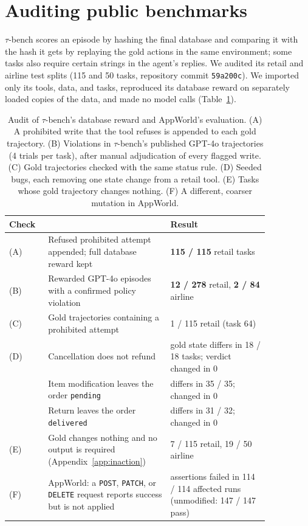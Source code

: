 \documentclass[11pt,a4paper]{article}
\begin{document}
\section{Auditing public benchmarks}
\label{sec:taubench}

$\tau$-bench scores an episode by hashing the final database and comparing it with the hash it gets by replaying the gold actions in the same environment; some tasks also require certain strings in the agent's replies. We audited its retail and airline test splits (115 and 50 tasks, repository commit \texttt{59a200c}). We imported only its tools, data, and tasks, reproduced its database reward on separately loaded copies of the data, and made no model calls (Table~\ref{tab:taubench}).

\begin{table}[t]
\centering
\small
\caption{Audit of $\tau$-bench's database reward and AppWorld's evaluation. (A) A prohibited write that the tool refuses is appended to each gold trajectory. (B) Violations in $\tau$-bench's published GPT-4o trajectories (4 trials per task), after manual adjudication of every flagged write. (C) Gold trajectories checked with the same status rule. (D) Seeded bugs, each removing one state change from a retail tool. (E) Tasks whose gold trajectory changes nothing. (F) A different, coarser mutation in AppWorld.}
\label{tab:taubench}
\begin{tabular}{l p{0.47\linewidth} p{0.38\linewidth}}
\toprule
\multicolumn{2}{l}{Check} & Result \\
\midrule
(A) & Refused prohibited attempt appended; full database reward kept & \textbf{115 / 115} retail tasks \\
(B) & Rewarded GPT-4o episodes with a confirmed policy violation & \textbf{12 / 278} retail, \textbf{2 / 84} airline \\
(C) & Gold trajectories containing a prohibited attempt & 1 / 115 retail (task 64) \\
\midrule
(D) & Cancellation does not refund & gold state differs in 18 / 18 tasks; verdict changed in 0 \\
    & Item modification leaves the order \texttt{pending} & differs in 35 / 35; changed in 0 \\
    & Return leaves the order \texttt{delivered} & differs in 31 / 32; changed in 0 \\
(E) & Gold changes nothing and no output is required (Appendix~\ref{app:inaction}) & 7 / 115 retail, 19 / 50 airline \\
\midrule
(F) & AppWorld: a \texttt{POST}, \texttt{PATCH}, or \texttt{DELETE} request reports success but is not applied & assertions failed in 114 / 114 affected runs (unmodified: 147 / 147 pass) \\
\bottomrule
\end{tabular}
\end{table}
\end{document}
